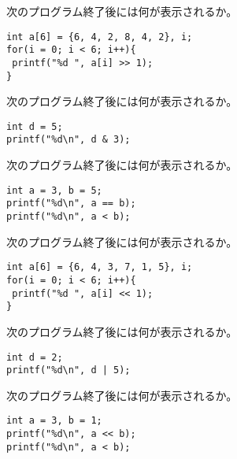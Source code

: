 \documentclass[12pt,a4j]{jarticle}
\newcounter{toi}
\def\toi{%
\bigskip\bigskip\noindent
\addtocounter{toi}{1}
\shadowbox{\bfseries\large 問\thetoi}
\nopagebreak[4]\bigskip\nopagebreak[4]
}
\begin{document}



\toi


次のプログラム終了後には何が表示されるか。
\begin{verbatim}
int a[6] = {6, 4, 2, 8, 4, 2}, i;
for(i = 0; i < 6; i++){
 printf("%d ", a[i] >> 1);
}
\end{verbatim}


\toi

次のプログラム終了後には何が表示されるか。
\begin{verbatim}
int d = 5;
printf("%d\n", d & 3);
\end{verbatim}







\toi


次のプログラム終了後には何が表示されるか。
\begin{verbatim}
int a = 3, b = 5;
printf("%d\n", a == b);
printf("%d\n", a < b);
\end{verbatim}




\toi


次のプログラム終了後には何が表示されるか。
\begin{verbatim}
int a[6] = {6, 4, 3, 7, 1, 5}, i;
for(i = 0; i < 6; i++){
 printf("%d ", a[i] << 1);
}
\end{verbatim}





\toi


次のプログラム終了後には何が表示されるか。
\begin{verbatim}
int d = 2;
printf("%d\n", d | 5);
\end{verbatim}







\toi


次のプログラム終了後には何が表示されるか。
\begin{verbatim}
int a = 3, b = 1;
printf("%d\n", a << b);
printf("%d\n", a < b);
\end{verbatim}
\end{document}
